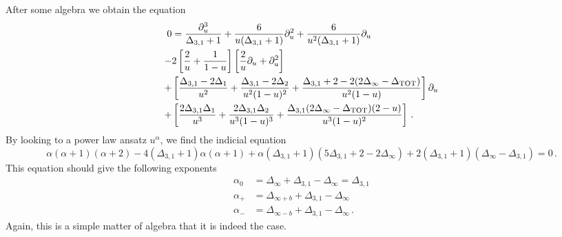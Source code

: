 \documentclass[11pt]{article}
\begin{document}
After some algebra we obtain the equation
\begin{equation}
  \begin{aligned}
    0 &= \frac{\partial_u^3}{\Delta_{3,1}+1} + \frac{6}{u(\Delta_{3,1}+1)}\partial_u^2 +\frac{6}{u^2(\Delta_{3,1}+1)}\partial_u\\
    -&2\left[\frac{2}{u}+\frac{1}{1-u}\right]\left[\frac{2}{u}\partial_u +\partial_u^2\right] \\
    +&\left[\frac{\Delta_{3,1}-2\Delta_1}{u^2}+\frac{\Delta_{3,1}-2\Delta_2}{u^2(1-u)^2}+\frac{\Delta_{3,1}+2-2(2\Delta_{\infty}-\Delta_{\rm TOT})}{u^2(1-u)}\right]\partial_u\\
    +&\left[\frac{2\Delta_{3,1}\Delta_1}{u^3}+\frac{2\Delta_{3,1}\Delta_2}{u^3(1-u)^3}+\frac{\Delta_{3,1}(2\Delta_{\infty}-\Delta_{\rm TOT})(2-u)}{u^3(1-u)^2}\right]\,.
  \end{aligned}
\end{equation}
By looking to a power law ansatz $u^{\alpha}$, we find the indicial equation
\begin{equation}
  \alpha(\alpha+1)(\alpha+2)-4(\Delta_{3,1}+1)\alpha(\alpha+1)+\alpha(\Delta_{3,1}+1)(5\Delta_{3,1}+2 -2\Delta_{\infty})+2(\Delta_{3,1}+1)(\Delta_{\infty}-\Delta_{3,1}) =0\,.
\end{equation}
This equation should give the following exponents
\begin{equation}
  \begin{aligned}
    \alpha_{0} &= \Delta_{\infty} + \Delta_{3,1} - \Delta_{\infty} = \Delta_{3,1}\\
    \alpha_{+} &=  \Delta_{\infty +b} + \Delta_{3,1} - \Delta_{\infty} \\
    \alpha_{-} &=  \Delta_{\infty -b} + \Delta_{3,1} - \Delta_{\infty}\,.
  \end{aligned}
\end{equation}
Again, this is a simple matter of algebra that it is indeed the case.
\end{document}
